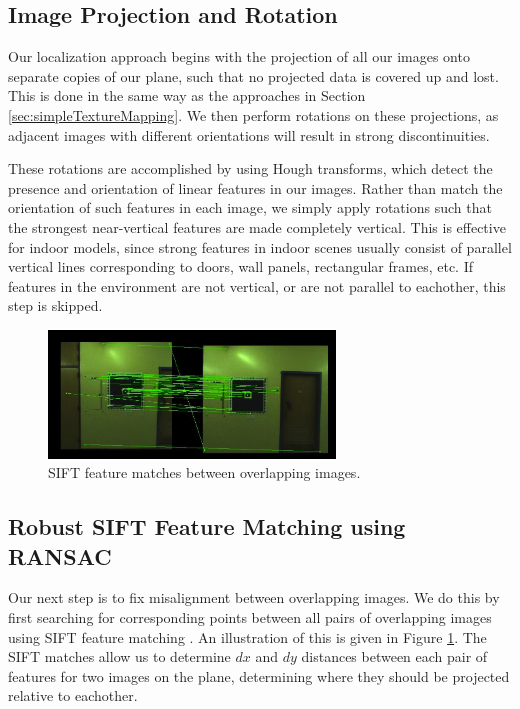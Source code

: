 \message{ !name(paper.tex)}\documentclass[10pt,twocolumn,letterpaper]{article}
\begin{document}
\subsection{Image Projection and Rotation}
\label{sec:projectionAndRotation}
Our localization approach begins with the projection of all our images
onto separate copies of our plane, such that no projected data is
covered up and lost. This is done in the same way as the approaches in
Section \ref{sec:simpleTextureMapping}. We then perform rotations on
these projections, as adjacent images with different orientations will
result in strong discontinuities.

These rotations are accomplished by using Hough transforms, which
detect the presence and orientation of linear features in our
images. Rather than match the orientation of such features in each
image, we simply apply rotations such that the strongest near-vertical
features are made completely vertical. This is effective for indoor
models, since strong features in indoor scenes usually consist of
parallel vertical lines corresponding to doors, wall panels,
rectangular frames, etc. If features in the environment are not
vertical, or are not parallel to eachother, this step is skipped.


\begin{figure}
  \centering
  \includegraphics[width=3in]{matches.jpg}
  \caption{SIFT feature matches between overlapping images.}
  \label{fig:matches}
\end{figure}



\subsection{Robust SIFT Feature Matching using RANSAC}
\label{sec:robustSIFTFeatureMatching}
Our next step is to fix misalignment between overlapping images. We do
this by first searching for corresponding points between all pairs of
overlapping images using SIFT feature matching
\cite{lowe1999object}. An illustration of this is given in Figure
\ref{fig:matches}. The SIFT matches allow us to determine $dx$ and
$dy$ distances between each pair of features for two images on the
plane, determining where they should be projected relative to
eachother.
\end{document}
